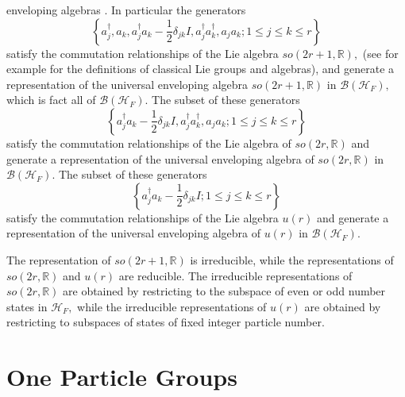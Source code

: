 \documentclass[12pt,aps,amsfonts,amssymb,tightenlines]{revtex4}%
\begin{document}
enveloping algebras \cite{Encyclo}. In particular the generators
\begin{equation}
\left\{  a_{j}^{\dagger},a_{k},a_{j}^{\dagger}a_{k}-\frac{1}{2}\delta
_{jk}I,a_{j}^{\dagger}a_{k}^{\dagger},a_{j}a_{k};1\leq j\leq k\leq r\right\}
\end{equation}
satisfy the commutation relationships of the Lie algebra $so\left(
2r+1,\mathbb{R}\right)  ,$ (see \cite{Gilmore_book} for example for the
definitions of classical Lie groups and algebras), and generate a
representation of the universal enveloping algebra $so\left(  2r+1,\mathbb{R}%
\right)  $ in $\mathcal{B}\left(  \mathcal{H}_{F}\right)  ,$ which is fact all
of $\mathcal{B}\left(  \mathcal{H}_{F}\right)  .$ The subset of these
generators
\begin{equation}
\left\{  a_{j}^{\dagger}a_{k}-\frac{1}{2}\delta_{jk}I,a_{j}^{\dagger}%
a_{k}^{\dagger},a_{j}a_{k};1\leq j\leq k\leq r\right\}
\end{equation}
satisfy the commutation relationships of the Lie algebra of $so\left(
2r,\mathbb{R}\right)  $ and generate a representation of the universal
enveloping algebra of $so\left(  2r,\mathbb{R}\right)  $ in $\mathcal{B}%
\left(  \mathcal{H}_{F}\right)  .$ The subset of these generators
\begin{equation}
\left\{  a_{j}^{\dagger}a_{k}-\frac{1}{2}\delta_{jk}I;1\leq j\leq k\leq
r\right\}
\end{equation}
satisfy the commutation relationships of the Lie algebra $u\left(  r\right)  $
and generate a representation of the universal enveloping algebra of $u\left(
r\right)  $ in $\mathcal{B}\left(  \mathcal{H}_{F}\right)  $.

The representation of $so\left(  2r+1,\mathbb{R}\right)  $ is irreducible,
while the representations of $so\left(  2r,\mathbb{R}\right)  $ and $u\left(
r\right)  $ are reducible. The irreducible representations of $so\left(
2r,\mathbb{R}\right)  $ are obtained by restricting to the subspace of even or
odd number states in $\mathcal{H}_{F},$ while the irreducible representations
of $u\left(  r\right)  $ are obtained by restricting to subspaces of states of
fixed integer particle number.

\section{One Particle Groups \label{one particle groups}}
\end{document}
